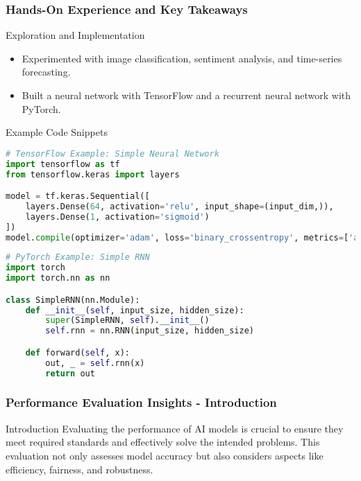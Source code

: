 \documentclass[aspectratio=169]{beamer}
\begin{document}
\begin{frame}[fragile]
    \frametitle{Hands-On Experience and Key Takeaways}
    \begin{block}{Exploration and Implementation}
        \begin{itemize}
            \item Experimented with image classification, sentiment analysis, and time-series forecasting.
            \item Built a neural network with TensorFlow and a recurrent neural network with PyTorch.
        \end{itemize}
    \end{block}

    \begin{block}{Example Code Snippets}
        \begin{lstlisting}[language=Python]
# TensorFlow Example: Simple Neural Network
import tensorflow as tf
from tensorflow.keras import layers

model = tf.keras.Sequential([
    layers.Dense(64, activation='relu', input_shape=(input_dim,)),
    layers.Dense(1, activation='sigmoid')
])
model.compile(optimizer='adam', loss='binary_crossentropy', metrics=['accuracy'])
        \end{lstlisting}

        \begin{lstlisting}[language=Python]
# PyTorch Example: Simple RNN
import torch
import torch.nn as nn

class SimpleRNN(nn.Module):
    def __init__(self, input_size, hidden_size):
        super(SimpleRNN, self).__init__()
        self.rnn = nn.RNN(input_size, hidden_size)

    def forward(self, x):
        out, _ = self.rnn(x)
        return out
        \end{lstlisting}
    \end{block}
\end{frame}

\begin{frame}[fragile]
    \frametitle{Performance Evaluation Insights - Introduction}
    \begin{block}{Introduction}
        Evaluating the performance of AI models is crucial to ensure they meet required standards and effectively solve the intended problems. This evaluation not only assesses model accuracy but also considers aspects like efficiency, fairness, and robustness.
    \end{block}
\end{frame}
\end{document}
